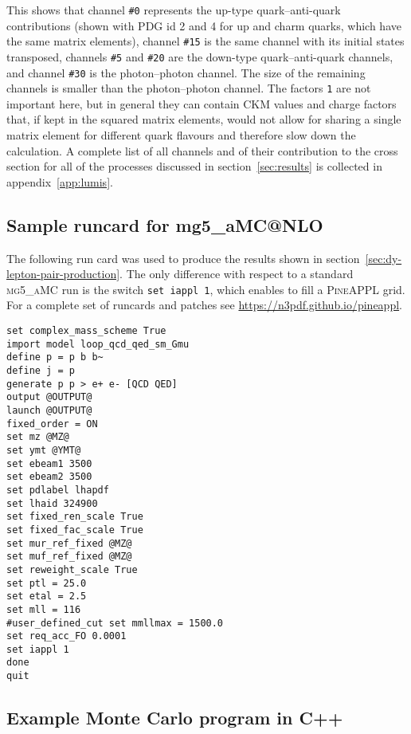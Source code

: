 This shows that channel \texttt{\#0} represents the up-type quark--anti-quark contributions (shown with PDG id 2 and 4 for up and charm quarks, which have the same matrix elements), channel \texttt{\#15} is the same channel with its initial states transposed, channels \texttt{\#5} and \texttt{\#20} are the down-type quark--anti-quark channels, and channel \texttt{\#30} is the photon--photon channel.
The size of the remaining channels is smaller than the photon--photon channel.
The factors \texttt{1} are not important here, but in general they can contain CKM values and charge factors that, if kept in the squared matrix elements, would not allow for sharing a single matrix element for different quark flavours and therefore slow down the calculation.
A complete list of all channels and of their contribution to the cross section for all of the processes discussed in section~\ref{sec:results} is collected in appendix~\ref{app:lumis}.

\subsection{Sample runcard for mg5\_aMC@NLO}
\label{app:sample-runcard}

The following run card was used to produce the results shown in section~\ref{sec:dy-lepton-pair-production}.
The only difference with respect to a standard \textsc{mg5\_aMC} run is the switch \texttt{set iappl 1}, which enables to fill a \textsc{PineAPPL} grid.
For a complete set of runcards and patches see \url{https://n3pdf.github.io/pineappl}.
\begin{verbatim}
set complex_mass_scheme True
import model loop_qcd_qed_sm_Gmu
define p = p b b~
define j = p
generate p p > e+ e- [QCD QED]
output @OUTPUT@
launch @OUTPUT@
fixed_order = ON
set mz @MZ@
set ymt @YMT@
set ebeam1 3500
set ebeam2 3500
set pdlabel lhapdf
set lhaid 324900
set fixed_ren_scale True
set fixed_fac_scale True
set mur_ref_fixed @MZ@
set muf_ref_fixed @MZ@
set reweight_scale True
set ptl = 25.0
set etal = 2.5
set mll = 116
#user_defined_cut set mmllmax = 1500.0
set req_acc_FO 0.0001
set iappl 1
done
quit
\end{verbatim}

\subsection{Example Monte Carlo program in C++}
\label{app:example-program}


